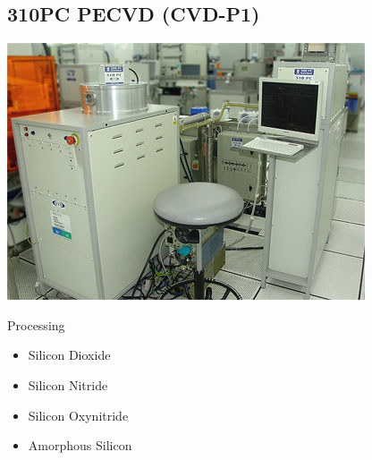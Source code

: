 \subsection{310PC PECVD (CVD-P1)}\label{diffusion_furnace_machine}
\WaferSemiClean

\begin{minipage}[H]{\MachinePictureWidth}
	\includegraphics[width=\MachinePictureWidth]{pictures_machines/thermal_pecvd1.png}
\end{minipage}\begin{minipage}[H]{0.5\textwidth}
Processing
\begin{itemize}
	\item Silicon Dioxide
	\item Silicon Nitride
	\item Silicon Oxynitride
	\item Amorphous Silicon
\end{itemize}
\end{minipage}

